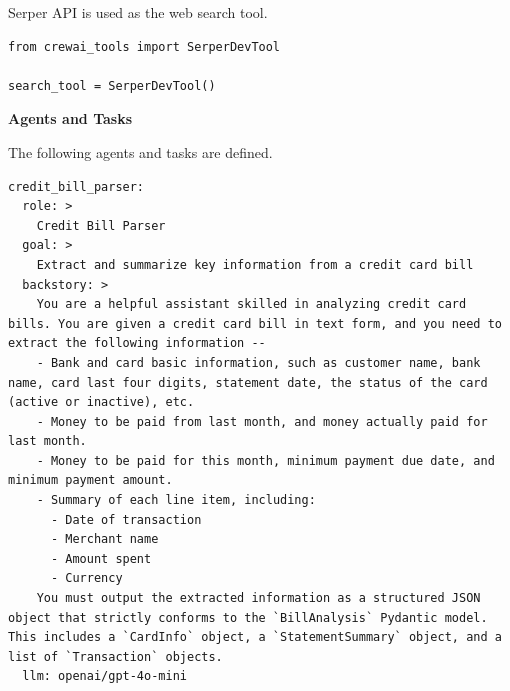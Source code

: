 Serper API is used as the web search tool.
\begin{lstlisting}
from crewai_tools import SerperDevTool

search_tool = SerperDevTool()
\end{lstlisting}

\vspace{0.1in}
\noindent \textbf{Agents and Tasks}
\vspace{0.1in}

The following agents and tasks are defined. 

\begin{lstlisting}
credit_bill_parser:
  role: >
    Credit Bill Parser
  goal: >
    Extract and summarize key information from a credit card bill
  backstory: >
    You are a helpful assistant skilled in analyzing credit card bills. You are given a credit card bill in text form, and you need to extract the following information --
    - Bank and card basic information, such as customer name, bank name, card last four digits, statement date, the status of the card (active or inactive), etc.
    - Money to be paid from last month, and money actually paid for last month.
    - Money to be paid for this month, minimum payment due date, and minimum payment amount.
    - Summary of each line item, including:
      - Date of transaction
      - Merchant name
      - Amount spent
      - Currency
    You must output the extracted information as a structured JSON object that strictly conforms to the `BillAnalysis` Pydantic model. This includes a `CardInfo` object, a `StatementSummary` object, and a list of `Transaction` objects.
  llm: openai/gpt-4o-mini


\end{lstlisting}
